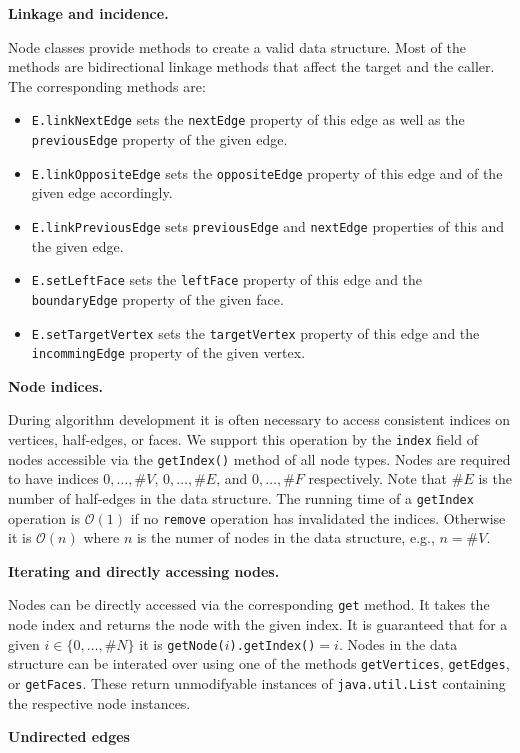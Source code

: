 \documentclass[Thesis.tex]{subfiles}
\begin{document}
{\bf Linkage and incidence.}

Node classes provide methods to create a valid data structure. Most of the methods are bidirectional linkage methods that affect the target and the caller. The corresponding methods are:
\begin{itemize}
\item {\tt E.linkNextEdge} sets the {\tt nextEdge} property of this edge as well as the 
{\tt previousEdge} property of the given edge.
\item {\tt E.linkOppositeEdge} sets the {\tt oppositeEdge} property of this edge and of the given edge accordingly.
\item {\tt E.linkPreviousEdge} sets {\tt previousEdge} and {\tt nextEdge} properties of this and the given edge.
\item {\tt E.setLeftFace} sets the {\tt leftFace} property of this edge and the {\tt boundaryEdge} property of the given face.
\item {\tt E.setTargetVertex} sets the {\tt targetVertex} property of this edge and the 
{\tt incommingEdge} property of the given vertex.
\end{itemize}

{\bf Node indices.}

During algorithm development it is often necessary to access consistent indices on vertices,
half-edges, or faces. We support this operation by the {\tt index} field of nodes accessible via
the {\tt getIndex()} method of all node types. Nodes are required to have indices $0,\ldots,\#V$,
$0,\ldots,\#E$, and $0,\ldots,\#F$ respectively. Note that $\#E$ is the number of half-edges
in the data structure. The running time of a {\tt getIndex} operation is $\mathcal{O}(1)$ if
no {\tt remove} operation has invalidated the indices. Otherwise it is $\mathcal{O}(n)$ where
$n$ is the numer of nodes in the data structure, e.g., $n=\#V$.

{\bf Iterating and directly accessing nodes.}

Nodes can be directly accessed via the corresponding {\tt get} method. It takes the node index
and returns the node with the given index. It is guaranteed that for a given $i\in \{0,\ldots,\#N\}$
it is {\tt getNode($i$).getIndex()$ = i$}.
Nodes in the data structure can be interated over using one of the methods {\tt getVertices}, 
{\tt getEdges}, or {\tt getFaces}. These return unmodifyable instances of {\tt java.util.List} containing the respective node instances.

{\bf Undirected edges}
\end{document}
